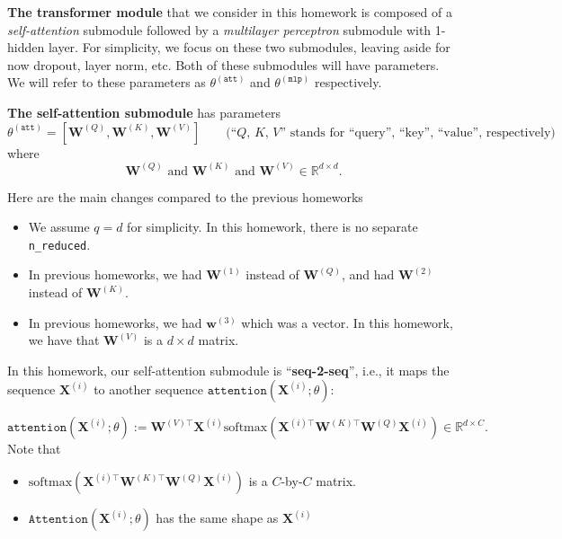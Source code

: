 \documentclass{article}
\newcommand{\bfX}{\mathbf{X}}
\newcommand{\bfw}{\mathbf{w}}
\newcommand{\bfW}{\mathbf{W}}
\begin{document}
\textbf{The transformer module}
 that we consider in this homework is composed of a \emph{self-attention} submodule followed by a
\emph{multilayer perceptron} submodule with 1-hidden layer.
For simplicity, we focus on these two submodules, leaving aside for now dropout, layer norm, etc.
Both of these submodules will have parameters. We will refer to these parameters as
\(
\theta^{(\texttt{att})}
\)
and
\(
\theta^{(\texttt{mlp})}
\)
respectively.

\vspace{1em}


\textbf{The self-attention submodule} has parameters
\[
\theta^{(\texttt{att})} = [ \bfW^{(Q)}, \bfW^{(K)}, \bfW^{(V)}]
\qquad
\mbox{
  (``\(Q\), \(K\), \(V\)''
  stands for
  ``query'',
  ``key'',
  ``value'', respectively)
}
\]
where
\[
  \bfW^{(Q)} \text{ and } \bfW^{(K)}
  \text{ and  }
\bfW^{(V)} \in \mathbb{R}^{d \times d}.
\]

Here are the main changes compared to the previous homeworks
\begin{itemize}
  \item  We assume \(q = d\) for simplicity. In this homework, there is no separate \texttt{n\_reduced}.



  \item

In previous homeworks, we had \(\bfW^{(1)}\) instead of \(\bfW^{(Q)}\), and had \(\bfW^{(2)}\) instead of \(\bfW^{(K)}\).


  \item
        In previous homeworks, we had \(\bfw^{(3)}\) which was a vector.
In this homework, we have       that
 \(\bfW^{(V)}\) is a \(d \times d\) matrix.
\end{itemize}

In this homework, our self-attention submodule
is ``\textbf{seq-2-seq}'', i.e., it
maps the sequence \(\bfX^{(i)}\) to another sequence \(\texttt{attention}(\bfX^{(i)}; \theta)\):

\[
\texttt{attention}(\bfX^{(i)} ; \theta)
:=
\bfW^{(V) \top}
\bfX^{(i)}
\mathrm{softmax} \left( \bfX^{(i)\top} \bfW^{(K)\top } \bfW^{(Q)} \bfX^{(i)} \right)
\in \mathbb{R}^{d \times C}.
\]
Note that
\begin{itemize}
  \item
\(\mathrm{softmax} \left( \bfX^{(i)\top} \bfW^{(K)\top } \bfW^{(Q)} \bfX^{(i)} \right)\) is a \(C\)-by-\(C\) matrix.

  \item
        \(
\texttt{Attention}(\bfX^{(i)} ; \theta)
        \)
        has the same shape as
        \(
\bfX^{(i)}
        \)

\end{itemize}
\end{document}
